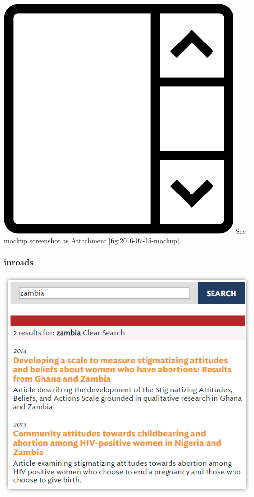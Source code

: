 \documentclass{article}
\begin{document}
\vspace{2em}
\noindent\includegraphics[height=\fontcharht\font`\B]{icons/attachment-screenshot} See mockup screenshot as Attachment \ref{fig:2016-07-15-mockup}.
\vspace{2em}

\subsubsection{inroads}

\begin{center}
\noindent\includegraphics{2016-07-15-inroads}
\end{center}
\end{document}
